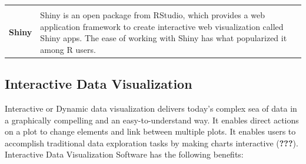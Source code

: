 \documentclass[]{book}
\begin{document}
\begin{longtable}[]{@{}ll@{}}
\begin{minipage}[t]{0.79\columnwidth}
\end{minipage}\tabularnewline
\begin{minipage}[t]{0.15\columnwidth}\raggedright
\textbf{Shiny}\strut
\end{minipage} & \begin{minipage}[t]{0.79\columnwidth}\raggedright
Shiny is an open package from RStudio, which provides a web application framework to create interactive web visualization called Shiny apps. The ease of working with Shiny has what popularized it among R users.\strut
\end{minipage}\tabularnewline
\bottomrule
\end{longtable}

\hypertarget{interactive-data-visualization}{%
\subsection{Interactive Data Visualization}\label{interactive-data-visualization}}

Interactive or Dynamic data visualization delivers today's complex sea of data in a graphically compelling and an easy-to-understand way. It enables direct actions on a plot to change elements and link between multiple plots. It enables users to accomplish traditional data exploration tasks by making charts interactive ({\textbf{???}}). Interactive Data Visualization Software has the following benefits:
\end{document}
